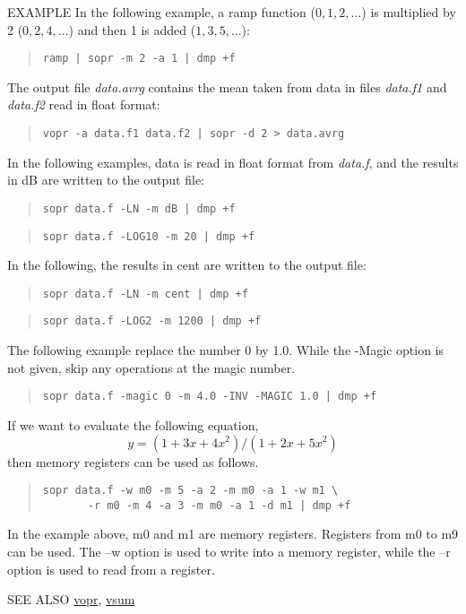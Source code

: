 \begin{qsection}{EXAMPLE}
In the following example, a ramp function ($0,1,2,\ldots$)
is multiplied by 2 ($0,2,4,\ldots$)
and then 1 is added ($1,3,5,\ldots$):
\begin{quote}
  \verb!ramp | sopr -m 2 -a 1 | dmp +f!
\end{quote}
\par
The output file {\em data.avrg} contains the mean taken from
data in files {\em data.f1} and {\em data.f2} read in float format:
\begin{quote}
  \verb!vopr -a data.f1 data.f2 | sopr -d 2 > data.avrg!
\end{quote}
\par
In the following examples,
data is read in float format from {\em data.f},
and the results in dB are written to the output file:
\begin{quote}
  \verb!sopr data.f -LN -m dB | dmp +f!
\end{quote}
\begin{quote}
  \verb!sopr data.f -LOG10 -m 20 | dmp +f!
\end{quote}
\par
In the following, the results in cent are written to the output file:
\begin{quote}
  \verb!sopr data.f -LN -m cent | dmp +f!
\end{quote}
\begin{quote}
  \verb!sopr data.f -LOG2 -m 1200 | dmp +f!
\end{quote}
\par
The following example replace the number 0 by 1.0.
While the -Magic option is not given,
skip any operations at the magic number.
\begin{quote}
  \verb!sopr data.f -magic 0 -m 4.0 -INV -MAGIC 1.0 | dmp +f!
\end{quote}
\par
If we want to evaluate the following equation,
\[
y = (1 + 3x + 4x^2) / (1 + 2x + 5x^2) 
\]
then memory registers can be used as follows.
\begin{quote}
\verb!sopr data.f -w m0 -m 5 -a 2 -m m0 -a 1 -w m1 \!\\
\verb!       -r m0 -m 4 -a 3 -m m0 -a 1 -d m1 | dmp +f!
\end{quote}
In the example above, m0 and m1 are memory registers.
Registers from m0 to m9 can be used.
The --w option is used to write into a memory register,
while the --r option is used to read from a register.
\end{qsection}

\begin{qsection}{SEE ALSO}
\hyperlink{vopr}{vopr},
\hyperlink{vsum}{vsum}
\end{qsection}
